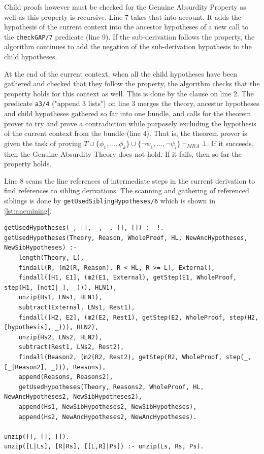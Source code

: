\documentclass[11pt,twoside,a4paper]{report}
\begin{document}
Child proofs however must be checked for the Genuine Absurdity Property as well as this property is recursive. Line 7 takes that into account. It adds the hypothesis of the current context into the ancestor hypotheses of a new call to the \lstinline$checkGAP/7$ predicate (line 9). If the sub-derivation follows the property, the algorithm continues to add the negation of the sub-derivation hypothesis to the child hypotheses. 

At the end of the current context, when all the child hypotheses have been gathered and checked that they follow the property, the algorithm checks that the property holds for this context as well. This is done by the clause on line 2. The predicate \lstinline$a3/4$ ("append 3 lists") on line 3 merges the theory, ancestor hypotheses and child hypotheses gathered so far into one bundle, and calls for the theorem prover to try and prove a contradiction while purposely excluding the hypothesis of the current context from the bundle (line 4). That is, the theorem prover is given the task of proving $T\cup\{\phi_1, ..., \phi_k\}\cup\{\neg\psi_1, ..., \neg\psi_l\}\vdash_{MRA}\bot$. If it succeeds, then the Genuine Absurdity Theory does not hold. If it fails, then so far the property holds.

Line 8 scans the line references of intermediate steps in the current derivation to find references to sibling derivations. The scanning and gathering of referenced siblings is done by \lstinline$getUsedSiblingHypotheses/6$ which is shown in \autoref{lst:ancmining}.

\begin{lstlisting}[caption={Gathering of referenced ancestor derivations for the original Genuine Absurdity Property definition},label=lst:ancmining]
% Uses the line references to find referenced sibling derivations
getUsedHypotheses(_, [], _, _, [], []) :- !.
getUsedHypotheses(Theory, Reason, WholeProof, HL, NewAncHypotheses, NewSibHypotheses) :-
	length(Theory, L),
	findall(R, (m2(R, Reason), R < HL, R >= L), External),
	findall([H1, E1], (m2(E1, External), getStep(E1, WholeProof, step(H1, [notI|_], _))), HLN1),
	unzip(Hs1, LNs1, HLN1),
	subtract(External, LNs1, Rest1),
	findall([H2, E2], (m2(E2, Rest1), getStep(E2, WholeProof, step(H2, [hypothesis], _))), HLN2),
	unzip(Hs2, LNs2, HLN2),
	subtract(Rest1, LNs2, Rest2),
	findall(Reason2, (m2(R2, Rest2), getStep(R2, WholeProof, step(_, [_|Reason2], _))), Reasons),
	append(Reasons, Reasons2),
	getUsedHypotheses(Theory, Reasons2, WholeProof, HL, NewAncHypotheses2, NewSibHypotheses2),
	append(Hs1, NewSibHypotheses2, NewSibHypotheses),
	append(Hs2, NewAncHypotheses2, NewAncHypotheses).
	
unzip([], [], []).
unzip([L|Ls], [R|Rs], [[L,R]|Ps]) :- unzip(Ls, Rs, Ps).
\end{lstlisting}
\end{document}
